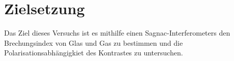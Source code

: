 \section{Zielsetzung}
\label{sec:Zielsetzung}
Das Ziel dieses Versuchs ist es mithilfe einen Sagnac-Interferometers 
den Brechungsindex von Glas und Gas zu bestimmen 
und die Polarisationsabhängigkiet des Kontrastes zu untersuchen.
